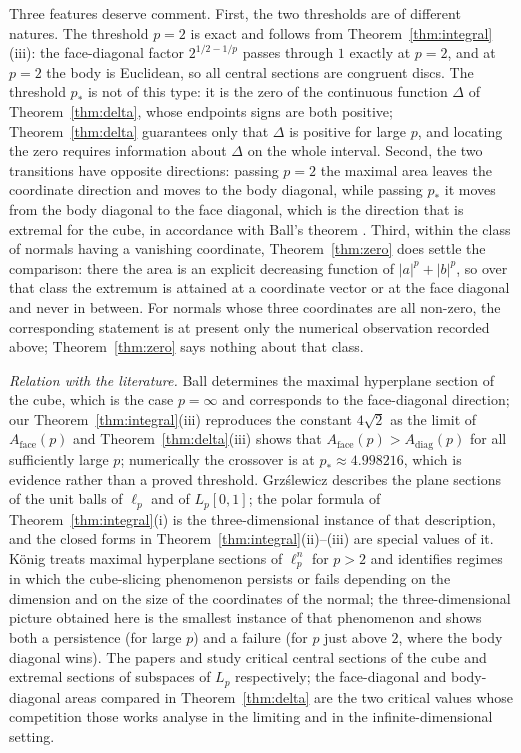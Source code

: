\documentclass[11pt]{article}
\theoremstyle{plain}
\numberwithin{theorem}{section}
\begin{document}
Three features deserve comment. First, the two thresholds are of different natures. The threshold $p=2$ is exact and follows from Theorem~\ref{thm:integral}(iii): the face-diagonal factor $2^{1/2-1/p}$ passes through $1$ exactly at $p=2$, and at $p=2$ the body is Euclidean, so all central sections are congruent discs. The threshold $p_*$ is not of this type: it is the zero of the continuous function $\Delta$ of Theorem~\ref{thm:delta}, whose endpoints signs are both positive; Theorem~\ref{thm:delta} guarantees only that $\Delta$ is positive for large $p$, and locating the zero requires information about $\Delta$ on the whole interval. Second, the two transitions have opposite directions: passing $p=2$ the maximal area leaves the coordinate direction and moves to the body diagonal, while passing $p_*$ it moves from the body diagonal to the face diagonal, which is the direction that is extremal for the cube, in accordance with Ball's theorem \cite{ball}. Third, within the class of normals having a vanishing coordinate, Theorem~\ref{thm:zero} does settle the comparison: there the area is an explicit decreasing function of $|a|^p+|b|^p$, so over that class the extremum is attained at a coordinate vector or at the face diagonal and never in between. For normals whose three coordinates are all non-zero, the corresponding statement is at present only the numerical observation recorded above; Theorem~\ref{thm:zero} says nothing about that class.

\emph{Relation with the literature.} Ball \cite{ball} determines the maximal hyperplane section of the cube, which is the case $p=\infty$ and corresponds to the face-diagonal direction; our Theorem~\ref{thm:integral}(iii) reproduces the constant $4\sqrt2$ as the limit of $A_{\mathrm{face}}(p)$ and Theorem~\ref{thm:delta}(iii) shows that $A_{\mathrm{face}}(p)>A_{\mathrm{diag}}(p)$ for all sufficiently large $p$; numerically the crossover is at $p_*\approx4.998216$, which is evidence rather than a proved threshold. Grz\'slewicz \cite{grzaslewicz} describes the plane sections of the unit balls of $\ell_p$ and of $L_p[0,1]$; the polar formula of Theorem~\ref{thm:integral}(i) is the three-dimensional instance of that description, and the closed forms in Theorem~\ref{thm:integral}(ii)--(iii) are special values of it. K\"onig \cite{konig} treats maximal hyperplane sections of $\ell_p^n$ for $p>2$ and identifies regimes in which the cube-slicing phenomenon persists or fails depending on the dimension and on the size of the coordinates of the normal; the three-dimensional picture obtained here is the smallest instance of that phenomenon and shows both a persistence (for large $p$) and a failure (for $p$ just above $2$, where the body diagonal wins). The papers \cite{ambrus} and \cite{eskenazis} study critical central sections of the cube and extremal sections of subspaces of $L_p$ respectively; the face-diagonal and body-diagonal areas compared in Theorem~\ref{thm:delta} are the two critical values whose competition those works analyse in the limiting and in the infinite-dimensional setting.
\end{document}
